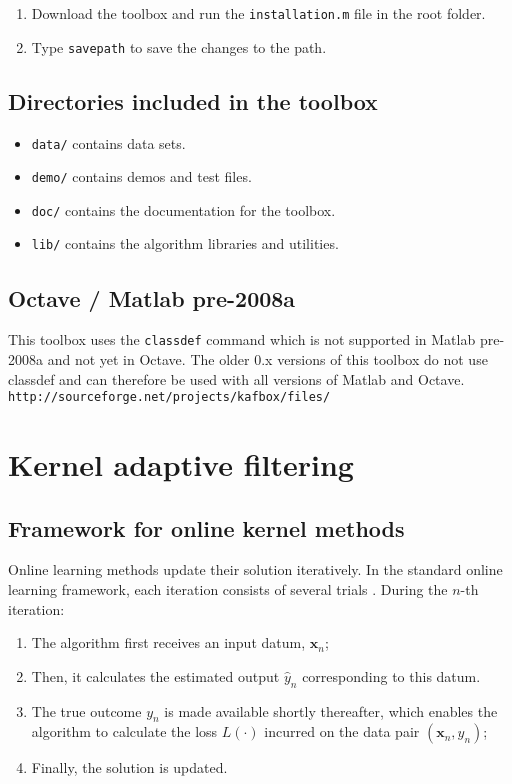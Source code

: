 \documentclass[]{report}
\def\x{{\mathbf x}}
\begin{document}
\begin{enumerate}
\item Download the toolbox and run the \verb"installation.m" file in the root folder.
\item Type \verb"savepath" to save the changes to the path.
\end{enumerate}

\section{Directories included in the toolbox}

\begin{itemize}
\item \verb"data/" contains data sets.
\item \verb"demo/" contains demos and test files.
\item \verb"doc/" contains the documentation for the toolbox.
\item \verb"lib/" contains the algorithm libraries and utilities.
\end{itemize}

\section{Octave / Matlab pre-2008a}

This toolbox uses the \verb"classdef" command which is not supported in Matlab pre-2008a and not yet in Octave. The older 0.x versions of this toolbox do not use classdef and can therefore be used with all versions of Matlab and Octave. \verb"http://sourceforge.net/projects/kafbox/files/"


\chapter{Kernel adaptive filtering}

\section{Framework for online kernel methods}

Online learning methods update their solution iteratively. In the standard online learning framework, each iteration consists of several trials \cite{blum1998line}. During the $n$-th iteration:
\begin{enumerate}
\item The algorithm first receives an input datum, $\x_n$;
\item Then, it calculates the estimated output $\hat y_n$ corresponding to this datum.
\item The true outcome $y_n$ is made available shortly thereafter, which enables the algorithm to calculate the loss $L(\cdot)$ incurred on the data pair $(\x_n,y_n)$;
\item Finally, the solution is updated.
\end{enumerate}
\end{document}
